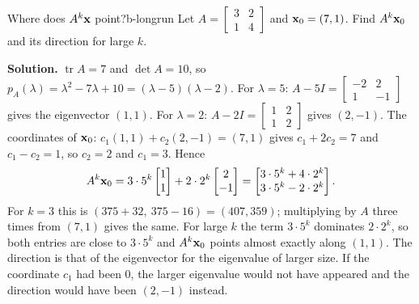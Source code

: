 \documentclass[11pt]{article}
\begin{document}
\begin{exmp}{Where does $A^k\mathbf{x}$ point?}{b-longrun}
Let $A=\begin{bmatrix}3&2\\1&4\end{bmatrix}$ and $\mathbf{x}_0=(7,1)$. Find $A^k\mathbf{x}_0$ and its direction for large $k$.

\textbf{Solution.} $\operatorname{tr}A=7$ and $\det A=10$, so $p_A(\lambda)=\lambda^2-7\lambda+10=(\lambda-5)(\lambda-2)$. For $\lambda=5$: $A-5I=\begin{bmatrix}-2&2\\1&-1\end{bmatrix}$ gives the eigenvector $(1,1)$. For $\lambda=2$: $A-2I=\begin{bmatrix}1&2\\1&2\end{bmatrix}$ gives $(2,-1)$. The coordinates of $\mathbf{x}_0$: $c_1(1,1)+c_2(2,-1)=(7,1)$ gives $c_1+2c_2=7$ and $c_1-c_2=1$, so $c_2=2$ and $c_1=3$. Hence
\[
A^k\mathbf{x}_0=3\cdot5^k\begin{bmatrix}1\\1\end{bmatrix}+2\cdot2^k\begin{bmatrix}2\\-1\end{bmatrix}=\begin{bmatrix}3\cdot5^k+4\cdot2^k\\3\cdot5^k-2\cdot2^k\end{bmatrix}.
\]
For $k=3$ this is $(375+32,\ 375-16)=(407,359)$; multiplying by $A$ three times from $(7,1)$ gives the same. For large $k$ the term $3\cdot5^k$ dominates $2\cdot2^k$, so both entries are close to $3\cdot5^k$ and $A^k\mathbf{x}_0$ points almost exactly along $(1,1)$. The direction is that of the eigenvector for the eigenvalue of larger size. If the coordinate $c_1$ had been $0$, the larger eigenvalue would not have appeared and the direction would have been $(2,-1)$ instead.
\end{exmp}
\end{document}
